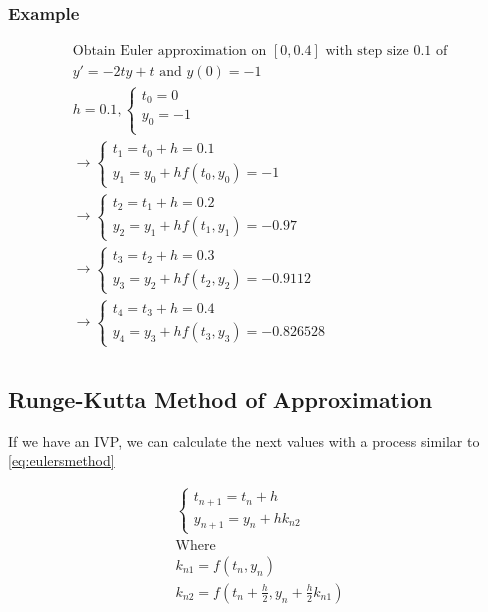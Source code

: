         \subsubsection{Example}
        \[
        \begin{aligned}
        \text{Obtain Euler approximation on }[0, 0.4] \text{ with step size } 0.1 \text{ of}\\
        y\prime = -2ty + t \text{ and } y(0) = -1\\
        h = 0.1, 
        \begin{cases}
        t_0 = 0\\
        y_0 = -1\\
        \end{cases} \\
        \to \begin{cases}
        t_1 = t_0 + h = 0.1\\
        y_1 = y_0 + h f(t_0, y_0) = -1
        \end{cases}\\
        \to \begin{cases}
        t_2 = t_1 + h = 0.2\\
        y_2 = y_1 + h f(t_1, y_1) = -0.97
        \end{cases}\\
        \to \begin{cases}
        t_3 = t_2 + h = 0.3\\
        y_3 = y_2 + h f(t_2, y_2) = -0.9112
        \end{cases}\\
        \to \begin{cases}
        t_4 = t_3 + h = 0.4\\
        y_4 = y_3 + h f(t_3, y_3) = -0.826528
        \end{cases}\\
        \end{aligned}
        \]
    \subsection{Runge-Kutta Method of Approximation}
    If we have an IVP, we can calculate the next values with a process similar to \eqref{eq:eulersmethod}

    \begin{equation}\label{eq:2ork}
    \begin{aligned}
    \begin{cases}
    t_{n+1} = t_n + h\\
    y_{n+1} = y_n + h k_{n2}
    \end{cases}\\
    \text{Where}\\
    k_{n1} = f(t_n, y_n)\\
    k_{n2} = f \left( t_n + \frac{h}{2}, y_n + \frac{h}{2} k_{n1} \right)
    \end{aligned}
    \end{equation}

